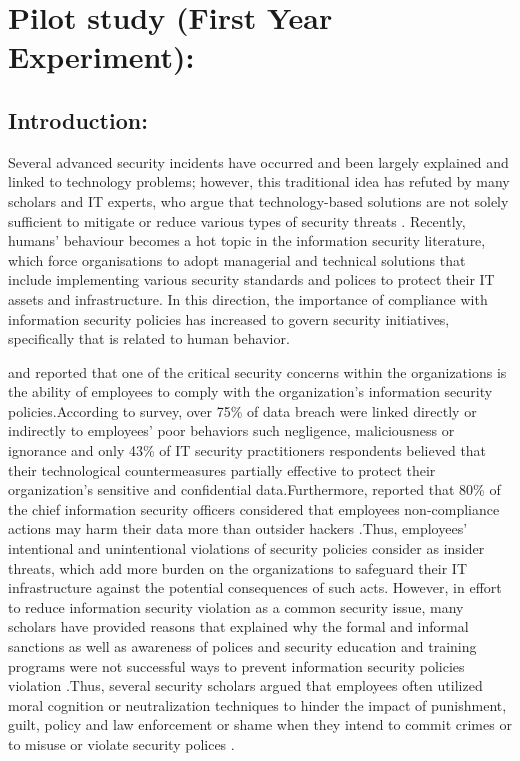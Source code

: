 
\section{Pilot study (First Year Experiment):}
\subsection {Introduction:}
Several advanced security incidents have occurred and been largely explained and linked to technology problems; however, this traditional idea has refuted by many scholars and IT experts, who argue that technology-based solutions are not solely sufficient to mitigate or reduce various types of security threats \cite{Kim2014,Ashenden2008,Safa2015}. Recently, humans' behaviour becomes a hot topic in the information security literature, which force organisations to adopt managerial and technical solutions that include implementing various security standards and polices to protect their IT assets and infrastructure. 
In this direction, the importance of compliance with information security policies has increased to govern security initiatives, specifically that is related to human behavior. \

\cite{Siponen2010} and \cite{Puhakainen2010} reported that one of the critical security concerns within the organizations is the ability of employees to comply with the organization's information security policies.According to \citet{PonemonInstitute2012} survey, over 75\% of data breach were linked directly or indirectly to employees' poor behaviors such negligence, maliciousness or ignorance and only 43\% of IT security practitioners respondents believed that their technological countermeasures partially effective to protect their organization's sensitive and confidential data.Furthermore, \cite{Barlow2013} reported that 80\% of the chief information security officers considered that employees non-compliance actions may harm their data more than outsider hackers .Thus, employees' intentional and unintentional violations of security policies consider as insider threats, which add more burden on the organizations to safeguard their IT infrastructure against the potential consequences of such acts. 
However, in effort to reduce information security violation as a common security issue, many scholars have provided reasons that explained why the formal and informal sanctions as well as awareness of polices and security education and training programs were not successful ways to prevent information security policies violation \cite{Siponen2010,Darcy,Chen2012,}.Thus, several security scholars argued that employees often utilized moral cognition or neutralization techniques to hinder the impact of punishment, guilt, policy and law enforcement or shame when they intend to commit crimes or to misuse or violate security polices \cite{Siponen2010,Barlow2013,Teh2015,Sykes1957,Kim2014,Hinduja2007,Ingram2008}.\
